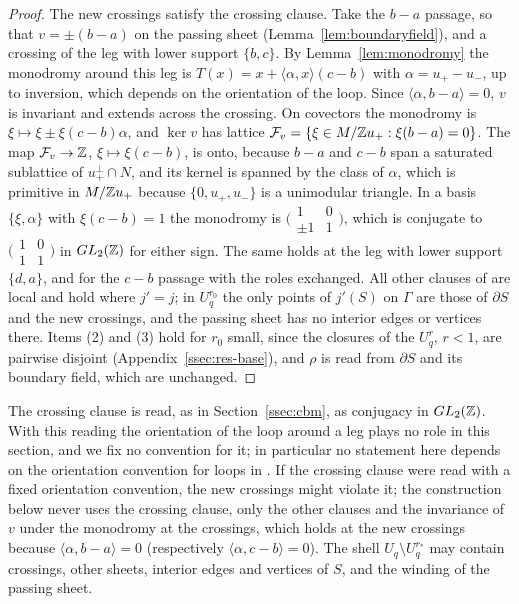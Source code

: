 \begin{proof}
The new crossings satisfy the crossing clause. Take the $b-a$ passage, so that $v=\pm(b-a)$ on the passing sheet
(Lemma~\ref{lem:boundaryfield}), and a crossing of the leg with lower support $\{b,c\}$. By Lemma~\ref{lem:monodromy} the
monodromy around this leg is $T(x)=x+\langle\alpha,x\rangle(c-b)$ with $\alpha=u_+-u_-$, up to inversion, which depends on
the orientation of the loop. Since $\langle\alpha,b-a\rangle=0$, $v$ is invariant and extends across the crossing. On
covectors the monodromy is $\xi\mapsto\xi\pm\xi(c-b)\alpha$, and $\ker v$ has lattice
$\mathcal F_v=\{\xi\in M/\mathbb Z u_+:\xi(b-a)=0\}$. The map $\mathcal F_v\to\mathbb Z$, $\xi\mapsto\xi(c-b)$, is onto, because $b-a$ and
$c-b$ span a saturated sublattice of $u_+^\perp\cap N$, and its kernel is spanned by the class of $\alpha$, which is primitive
in $M/\mathbb Z u_+$ because $\{0,u_+,u_-\}$ is a unimodular triangle. In a basis $\{\xi,\alpha\}$ with $\xi(c-b)=1$ the monodromy is
$\bigl(\begin{smallmatrix}1&0\\\pm1&1\end{smallmatrix}\bigr)$, which is conjugate to
$\bigl(\begin{smallmatrix}1&0\\1&1\end{smallmatrix}\bigr)$ in $GL_2(\mathbb Z)$ for either sign. The same holds at the leg with lower
support $\{d,a\}$, and for the $c-b$ passage with the roles exchanged. All other clauses of \cite[Def.~7.2]{CBM} are local and
hold where $j'=j$; in $U^{r_0}_q$ the only points of $j'(S)$ on $\Gamma$ are those of $\partial S$ and the new crossings, and
the passing sheet has no interior edges or vertices there. Items (2) and (3) hold for $r_0$ small, since the closures of
the $U^{r}_q$, $r<1$, are pairwise disjoint (Appendix~\ref{ssec:res-base}), and $\rho$ is read from $\partial S$ and its
boundary field, which are unchanged.
\end{proof}

The crossing clause is read, as in Section~\ref{ssec:cbm}, as conjugacy in $GL_2(\mathbb Z)$. With this reading the orientation of the loop
around a leg plays no role in this section, and we fix no convention for it; in particular no statement here depends on
the orientation convention for loops in \cite[Prop.~3.15]{Gross2005}. If the crossing clause were read with a fixed orientation
convention, the new crossings might violate it; the construction below never uses the crossing clause, only the other clauses and
the invariance of $v$ under the monodromy at the crossings, which holds at the new crossings because
$\langle\alpha,b-a\rangle=0$ (respectively $\langle\alpha,c-b\rangle=0$). The shell $U_q\setminus U_q^{r_*}$ may contain crossings, other sheets, interior edges and vertices of $S$, and the
winding of the passing sheet.

